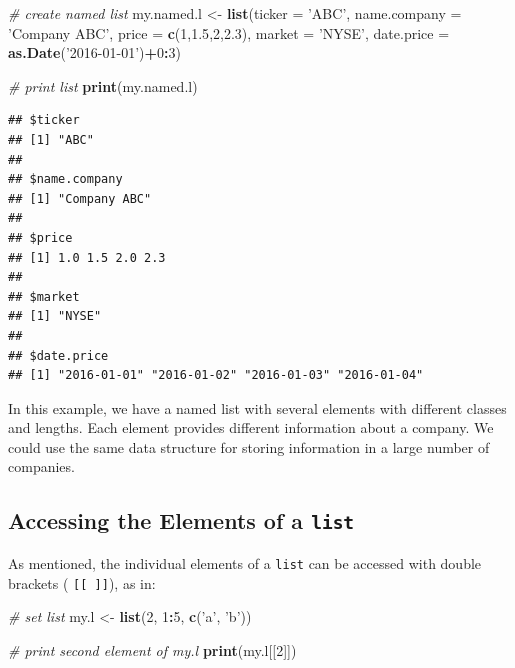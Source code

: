 \documentclass[11pt,]{book}
\newenvironment{Shaded}{\begin{snugshade}}{\end{snugshade}}
\newcommand{\KeywordTok}[1]{\textcolor[rgb]{0.27,0.27,0.27}{\textbf{#1}}}
\newcommand{\DataTypeTok}[1]{\textcolor[rgb]{0.27,0.27,0.27}{#1}}
\newcommand{\DecValTok}[1]{\textcolor[rgb]{0.06,0.06,0.06}{#1}}
\newcommand{\FloatTok}[1]{\textcolor[rgb]{0.06,0.06,0.06}{#1}}
\newcommand{\StringTok}[1]{\textcolor[rgb]{0.5,0.5,0.5}{#1}}
\newcommand{\CommentTok}[1]{\textcolor[rgb]{0.56,0.35,0.01}{\textit{#1}}}
\newcommand{\OperatorTok}[1]{\textcolor[rgb]{0.81,0.36,0.00}{\textbf{#1}}}
\newcommand{\NormalTok}[1]{#1}
\begin{document}
\begin{Shaded}
\begin{Highlighting}[]
\CommentTok{# create named list}
\NormalTok{my.named.l <-}\StringTok{ }\KeywordTok{list}\NormalTok{(}\DataTypeTok{ticker =} \StringTok{'ABC'}\NormalTok{, }
                   \DataTypeTok{name.company =} \StringTok{'Company ABC'}\NormalTok{,}
                   \DataTypeTok{price =} \KeywordTok{c}\NormalTok{(}\DecValTok{1}\NormalTok{,}\FloatTok{1.5}\NormalTok{,}\DecValTok{2}\NormalTok{,}\FloatTok{2.3}\NormalTok{), }
                   \DataTypeTok{market =} \StringTok{'NYSE'}\NormalTok{, }
                   \DataTypeTok{date.price =} \KeywordTok{as.Date}\NormalTok{(}\StringTok{'2016-01-01'}\NormalTok{)}\OperatorTok{+}\DecValTok{0}\OperatorTok{:}\DecValTok{3}\NormalTok{)}

\CommentTok{# print list          }
\KeywordTok{print}\NormalTok{(my.named.l)}
\end{Highlighting}
\end{Shaded}

\begin{verbatim}
## $ticker
## [1] "ABC"
## 
## $name.company
## [1] "Company ABC"
## 
## $price
## [1] 1.0 1.5 2.0 2.3
## 
## $market
## [1] "NYSE"
## 
## $date.price
## [1] "2016-01-01" "2016-01-02" "2016-01-03" "2016-01-04"
\end{verbatim}

In this example, we have a named list with several elements with
different classes and lengths. Each element provides different
information about a company. We could use the same data structure for
storing information in a large number of companies.

\subsection{\texorpdfstring{Accessing the Elements of a
\texttt{list}}{Accessing the Elements of a list}}\label{accessing-the-elements-of-a-list}

As mentioned, the individual elements of a \texttt{list} can be accessed
with double brackets ( \texttt{{[}{[}\ {]}{]}}), as in: \index{[[ ]]}

\begin{Shaded}
\begin{Highlighting}[]
\CommentTok{# set list}
\NormalTok{my.l <-}\StringTok{ }\KeywordTok{list}\NormalTok{(}\DecValTok{2}\NormalTok{, }\DecValTok{1}\OperatorTok{:}\DecValTok{5}\NormalTok{, }\KeywordTok{c}\NormalTok{(}\StringTok{'a'}\NormalTok{, }\StringTok{'b'}\NormalTok{))}

\CommentTok{# print second element of my.l}
\KeywordTok{print}\NormalTok{(my.l[[}\DecValTok{2}\NormalTok{]])}
\end{Highlighting}
\end{Shaded}
\end{document}
